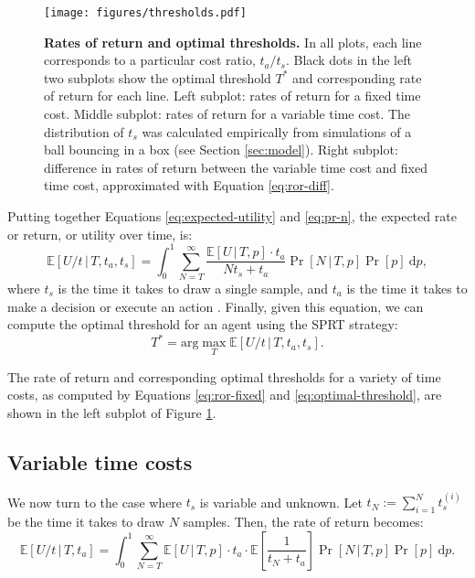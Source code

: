 \documentclass[11pt]{article}
\begin{document}
\begin{figure}[t]
    \begin{center}
        \texttt{[image: figures/thresholds.pdf]}
        \caption{\textbf{Rates of return and optimal thresholds.} In all plots, each line corresponds to a particular cost ratio, $t_a/t_s$. Black dots in the left two subplots show the optimal threshold $T^*$ and corresponding rate of return for each line. Left subplot: rates of return for a fixed time cost. Middle subplot: rates of return for a variable time cost. The distribution of $t_s$ was calculated empirically from simulations of a ball bouncing in a box (see Section \ref{sec:model}). Right subplot: difference in rates of return between the variable time cost and fixed time cost, approximated with Equation \ref{eq:ror-diff}.}
        \label{fig:rors}
    \end{center}
\end{figure}

Putting together Equations \ref{eq:expected-utility} and \ref{eq:pr-n}, the expected rate or return, or utility over time, is:
\begin{equation}
\mathbb{E}[U/t\,|\,T,t_a,t_s]=\int_0^1 \sum_{N=T}^\infty \frac{\mathbb{E}[U\,|\,T,p]\cdot{}t_a}{Nt_s+t_a}\Pr[N\,|\,T,p]\Pr[p]\ \mathrm{d}p,
\label{eq:ror-fixed}
\end{equation}
where $t_s$ is the time it takes to draw a single sample, and $t_a$ is the time it takes to make a decision or execute an action \cite{Vul:2014ba}. Finally, given this equation, we can compute the optimal threshold for an agent using the SPRT strategy:
\begin{equation}
T^*=\mathrm{arg}\max_T \mathbb{E}[U/t\,|\,T,t_a,t_s].
\label{eq:optimal-threshold}
\end{equation}

The rate of return and corresponding optimal thresholds for a variety of time costs, as computed by Equations \ref{eq:ror-fixed} and \ref{eq:optimal-threshold}, are shown in the left subplot of Figure \ref{fig:rors}.

\subsection{Variable time costs}

We now turn to the case where $t_s$ is variable and unknown. Let $t_N:=\sum_{i=1}^N t_s^{(i)}$ be the time it takes to draw $N$ samples. Then, the rate of return becomes:
\begin{equation}
\mathbb{E}[U/t\,|\,T,t_a]=\int_0^1 \sum_{N=T}^\infty \mathbb{E}[U\,|\,T,p]\cdot{}t_a\cdot{}\mathbb{E}\left[\frac{1}{t_N+t_a}\right]\Pr[N\,|\,T,p]\Pr[p]\ \mathrm{d}p.
\label{eq:ror}
\end{equation}
\end{document}
